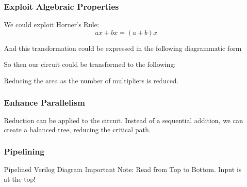 \documentclass[a4paper]{scrartcl}
\begin{document}
\subsubsection{Exploit Algebraic Properties}

We could exploit Horner's Rule:
\begin{equation*}
    ax + bx = (a+b)x
\end{equation*}

And this transformation could be expressed in the following diagrammatic form

\begin{example}
So then our circuit could be transformed to the following:

Reducing the area as the number of multipliers is reduced. 
\end{example}

\subsubsection{Enhance Parallelism}

Reduction can be applied to the circuit. Instead of a sequential addition, 
we can create a balanced tree, reducing the critical path. 

\subsubsection{Pipelining}
Pipelined Verilog Diagram Important Note: Read from Top to Bottom. Input is at the top!
\end{document}
